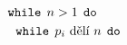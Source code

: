 \documentclass[preview]{standalone}
\begin{document}
\begin{align*}
\mathtt{while} & \:\: n > 1 \:\:  \mathtt{do}  \\&\hspace*{-2em} \mathtt{while}  \:\: p_i \text{ dělí } n \:\:  \mathtt{do}
\end{align*}
\end{document}
